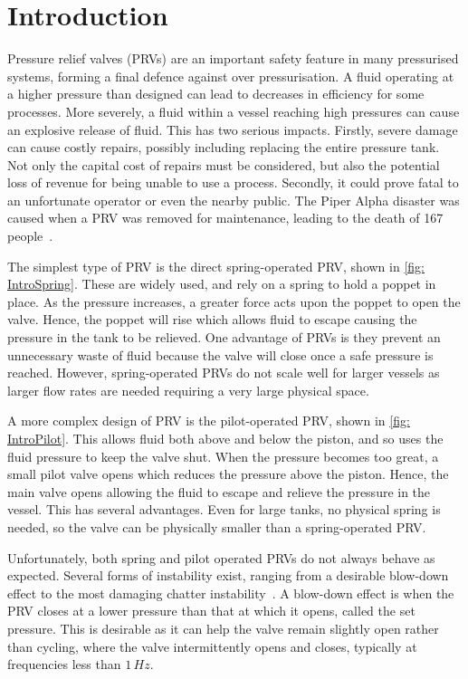 \chapter{Introduction}

Pressure relief valves (PRVs) are an important safety feature in many pressurised systems, forming a final defence against over pressurisation. A fluid operating at a higher pressure than designed can lead to decreases in efficiency for some processes. More severely, a fluid within a vessel reaching high pressures can cause an explosive release of fluid. This has two serious impacts. Firstly, severe damage can cause costly repairs, possibly including replacing the entire pressure tank. Not only the capital cost of repairs must be considered, but also the potential loss of revenue for being unable to use a process. Secondly, it could prove fatal to an unfortunate operator or even the nearby public. The Piper Alpha disaster was caused when a PRV was removed for maintenance, leading to the death of 167 people~\cite{Drysdale1998TheStudy}.

The simplest type of PRV is the direct spring-operated PRV, shown in \cref{fig: IntroSpring}. These are widely used, and rely on a spring to hold a poppet in place. As the pressure increases, a greater force acts upon the poppet to open the valve. Hence, the poppet will rise which allows fluid to escape causing the pressure in the tank to be relieved. One advantage of PRVs is they prevent an unnecessary waste of fluid because the valve will close once a safe pressure is reached. However, spring-operated PRVs do not scale well for larger vessels as larger flow rates are needed requiring a very large physical space.



A more complex design of PRV is the pilot-operated PRV, shown in \cref{fig: IntroPilot}. This allows fluid both above and below the piston, and so uses the fluid pressure to keep the valve shut. When the pressure becomes too great, a small pilot valve opens which reduces the pressure above the piston. Hence, the main valve opens allowing the fluid to escape and relieve the pressure in the vessel. This has several advantages. Even for large tanks, no physical spring is needed, so the valve can be physically smaller than a spring-operated PRV.

Unfortunately, both spring and pilot operated PRVs do not always behave as expected. Several forms of instability exist, ranging from a desirable blow-down effect to the most damaging chatter instability~\cite{Hos2017DynamicRecommendations}. A blow-down effect is when the PRV closes at a lower pressure than that at which it opens, called the set pressure. This is desirable as it can help the valve remain slightly open rather than cycling, where the valve intermittently opens and closes, typically at frequencies less than $1 \, \si{Hz}$.

